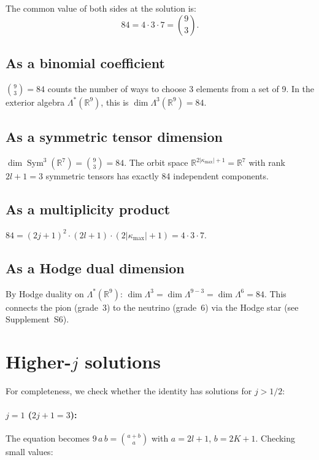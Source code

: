 \documentclass[11pt,letterpaper]{article}
\numberwithin{equation}{section}
\begin{document}
The common value of both sides at the solution is:
\begin{equation}
\label{eq:84}
  84 = 4 \cdot 3 \cdot 7 = \binom{9}{3}.
\end{equation}

\subsection{As a binomial coefficient}

$\binom{9}{3} = 84$ counts the number of ways to choose 3 elements from a
set of 9. In the exterior algebra $\Lambda^*(\mathbb{R}^9)$, this is
$\dim\Lambda^3(\mathbb{R}^9) = 84$.

\subsection{As a symmetric tensor dimension}

$\dim\operatorname{Sym}^3(\mathbb{R}^7) = \binom{9}{3} = 84$. The orbit
space $\mathbb{R}^{2|\kappa_\mathrm{max}|+1} = \mathbb{R}^7$ with
rank $2l+1 = 3$ symmetric tensors has exactly 84 independent components.

\subsection{As a multiplicity product}

$84 = (2j+1)^2 \cdot (2l+1) \cdot (2|\kappa_\mathrm{max}|+1) = 4 \cdot 3 \cdot 7$.

\subsection{As a Hodge dual dimension}

By Hodge duality on $\Lambda^*(\mathbb{R}^9)$:
$\dim\Lambda^3 = \dim\Lambda^{9-3} = \dim\Lambda^6 = 84$.
This connects the pion (grade~3) to the neutrino (grade~6) via the Hodge
star (see Supplement~S6).

\section{Higher-$j$ solutions}
\label{sec:higher_j}

For completeness, we check whether the identity has solutions for $j > 1/2$:

\paragraph{$j = 1$ ($2j+1 = 3$):}
The equation becomes $9\,a\,b = \binom{a+b}{a}$ with $a = 2l+1$, $b = 2K+1$.
Checking small values:
\end{document}
